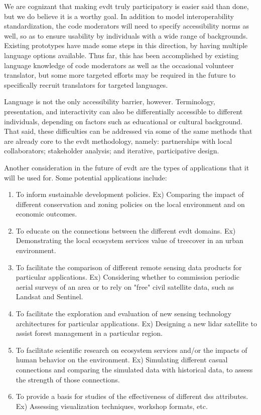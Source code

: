 We are cognizant that making \ac{evdt} truly participatory is easier said than done, but we do believe it is a worthy goal. In addition to model interoperability standardization, the code moderators will need to specify accessibility norms as well, so as to ensure usability by individuals with a wide range of backgrounds. Existing prototypes have made some steps in this direction, by having multiple language options available. Thus far, this has been accomplished by existing language knowledge of code moderators as well as the occasional volunteer translator, but some more targeted efforts may be required in the future to specifically recruit translators for targeted languages.

Language is not the only accessibility barrier, however. Terminology, presentation, and interactivity can also be differentially accessible to different individuals, depending on factors such as educational or cultural background. That said, these difficulties can be addressed via some of the same methods that are already core to the \ac{evdt} methodology, namely: partnerships with local collaborators; stakeholder analysis; and iterative, participative design. 

Another consideration in the future of \ac{evdt} are the types of applications that it will be used for. Some potential applications include:

\begin{enumerate} \setlength{\itemsep}{0pt} \setlength{\parskip}{0pt}
    \item To inform sustainable development policies. Ex) Comparing the impact of different conservation and zoning policies on the local environment and on economic outcomes.  \label{item:policy}
    \item To educate on the connections between the different \ac{evdt} domains. Ex) Demonstrating the local ecosystem services value of treecover in an urban environment.
	\item To facilitate the comparison of different remote sensing data products for particular applications. Ex) Considering whether to commission periodic aerial surveys of an area or to rely on "free" civil satellite data, such as Landsat and Sentinel. \label{item:data}
    \item To facilitate the exploration and evaluation of new sensing technology architectures for particular applications. Ex) Designing a new \ac{lidar} satellite to assist forest management in a particular region. \label{item:tech}
    \item To facilitate scientific research on ecosystem services and/or the impacts of human behavior on the environment. Ex) Simulating different casual connections and comparing the simulated data with historical data, to assess the strength of those connections.
    \item To provide a basis for studies of the effectiveness of different \ac{dss} attributes. Ex) Assessing visualization techniques, workshop formats, etc. \label{item:user}
\end{enumerate}

